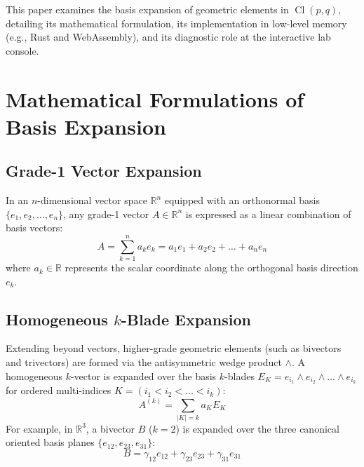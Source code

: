 \documentclass[conference]{IEEEtran}
\begin{document}
This paper examines the basis expansion of geometric elements in $\operatorname{Cl}(p,q)$, detailing its mathematical formulation, its implementation in low-level memory (e.g., Rust and WebAssembly), and its diagnostic role at the interactive lab console.

\section{Mathematical Formulations of Basis Expansion}
\label{sec:formulation}

\subsection{Grade-1 Vector Expansion}
In an $n$-dimensional vector space $\mathbb{R}^n$ equipped with an orthonormal basis $\{e_1, e_2, \dots, e_n\}$, any grade-1 vector $A \in \mathbb{R}^n$ is expressed as a linear combination of basis vectors:
\begin{equation}
    A = \sum_{k=1}^n a_k e_k = a_1 e_1 + a_2 e_2 + \dots + a_n e_n
    \label{eq:vector_expansion}
\end{equation}
where $a_k \in \mathbb{R}$ represents the scalar coordinate along the orthogonal basis direction $e_k$.

\subsection{Homogeneous \texorpdfstring{$k$}{k}-Blade Expansion}
Extending beyond vectors, higher-grade geometric elements (such as bivectors and trivectors) are formed via the antisymmetric wedge product $\wedge$. A homogeneous $k$-vector is expanded over the basis $k$-blades $E_K = e_{i_1} \wedge e_{i_2} \wedge \dots \wedge e_{i_k}$ for ordered multi-indices $K = (i_1 < i_2 < \dots < i_k)$:
\begin{equation}
    A^{(k)} = \sum_{|K|=k} a_K E_K
    \label{eq:blade_expansion}
\end{equation}
For example, in $\mathbb{R}^3$, a bivector $B$ ($k=2$) is expanded over the three canonical oriented basis planes $\{e_{12}, e_{23}, e_{31}\}$:
\begin{equation}
    B = \gamma_{12} e_{12} + \gamma_{23} e_{23} + \gamma_{31} e_{31}
\end{equation}
\end{document}
